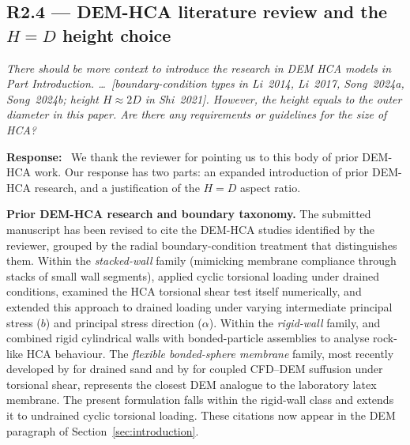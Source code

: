 \documentclass[11pt,a4paper]{article}
\newenvironment{rcomment}
  {\begin{leftbar}\color{black!75}\itshape}
  {\end{leftbar}\vspace{0.3em}}
\newcommand{\response}{\par\noindent\textbf{Response:}\ \ignorespaces}
\begin{document}
\subsection*{R2.4 --- DEM-HCA literature review and the $H=D$ height choice}

\begin{rcomment}
There should be more context to introduce the research in DEM HCA models in
Part Introduction. \dots\ [boundary-condition types in Li~2014, Li~2017,
Song~2024a, Song~2024b; height $H \approx 2D$ in Shi~2021]. However, the
height equals to the outer diameter in this paper. Are there any
requirements or guidelines for the size of HCA?
\end{rcomment}

\response
We thank the reviewer for pointing us to this body of prior DEM-HCA
work. Our response has two parts: an expanded introduction of prior
DEM-HCA research, and a justification of the $H=D$ aspect ratio.

\medskip
\noindent\textbf{Prior DEM-HCA research and boundary taxonomy.}
The submitted manuscript has been revised to cite the DEM-HCA
studies identified by the reviewer, grouped by the radial
boundary-condition treatment that distinguishes them. Within the
\emph{stacked-wall} family (mimicking membrane compliance through
stacks of small wall segments), \citet{LiGuoZhang2014} applied
cyclic torsional loading under drained conditions,
\citet{LiZhangGutierrez2015} examined the HCA torsional shear test
itself numerically, and \citet{LiChenGutierrez2017} extended this
approach to drained loading under varying intermediate principal
stress ($b$) and principal stress direction ($\alpha$). Within the
\emph{rigid-wall} family, \citet{Shi2021} and \citet{Liu2021}
combined rigid cylindrical walls with bonded-particle assemblies
to analyse rock-like HCA behaviour. The \emph{flexible
bonded-sphere membrane} family, most recently developed by
\citet{Song2024} for drained sand and by \citet{Song2024suffusion}
for coupled CFD--DEM suffusion under torsional shear, represents
the closest DEM analogue to the laboratory latex membrane. The
present formulation falls within the rigid-wall class and extends
it to undrained cyclic torsional loading. These citations now
appear in the DEM paragraph of Section~\ref{sec:introduction}.
\end{document}
